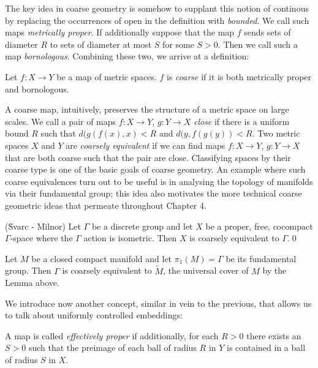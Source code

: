 The key idea in coarse geometry is somehow to supplant this notion of continous by replacing the occurrences of open in the definition with \textit{bounded}. We call such maps \textit{metrically proper}. If additionally suppose that the map $f$ sends sets of diameter $R$ to sets of diameter at most $S$ for some $S>0$. Then we call such a map \textit{bornologous}. Combining these two, we arrive at a definition:

\begin{definition}
Let $f:X \rightarrow Y$ be a map of metric spaces. $f$ is \textit{coarse} if it is both metrically proper and bornologous.
\end{definition}

A coarse map, intuitively, preserves the structure of a metric space on large scales. We call a pair of maps $f:X\rightarrow Y$, $g:Y\rightarrow X$ \textit{close} if there is a uniform bound $R$ such that $d(g(f(x),x)<R$ and $d(y,f(g(y))<R$. Two metric spaces $X$ and $Y$ are \textit{coarsely equivalent} if we can find maps $f:X\rightarrow Y$, $g:Y\rightarrow X$ that are both coarse such that the pair are close.  Classifying spaces by their coarse type is one of the basic goals of coarse geometry. An example where such coarse equivalences turn out to be useful is in analysing the topology of manifolds via their fundamental group; this idea also motivates the more technical coarse geometric ideas that permeate throughout Chapter 4.

\begin{lemma}(\u{S}varc - Milnor)
Let $\Gamma$ be a discrete group and let $X$ be a proper, free, cocompact $\Gamma$-space where the $\Gamma$ action is isometric. Then $X$ is coarsely equivalent to $\Gamma$.\qed
\end{lemma}

\begin{example}
Let $M$ be a closed compact manifold and let $\pi_{1}(M)=\Gamma$ be its fundamental group. Then $\Gamma$ is coarsely equivalent to $\tilde{M}$, the universal cover of $M$ by the Lemma above.
\end{example}

We introduce now another concept, similar in vein to the previous, that allows us to talk about uniformly controlled embeddings:

\begin{definition}
A map is called \textit{effectively proper} if additionally, for each $R>0$ there exists an $S>0$ such that the preimage of each ball of radius $R$ in $Y$ is contained in a ball of radius $S$ in $X$.
\end{definition}

